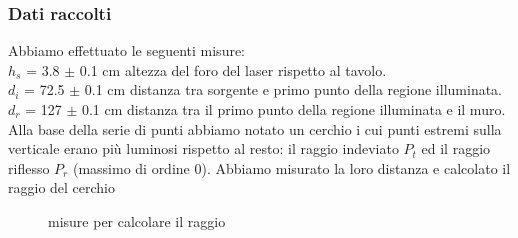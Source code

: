 \documentclass{article}
\theoremstyle{definition}
\begin{document}
\subsubsection{Dati raccolti}
Abbiamo effettuato le seguenti misure:\\

\noindent $h_{s}$ = 3.8 $\pm$ 0.1 cm altezza del foro del laser rispetto al tavolo.\\
$d_{i}$ = 72.5 $\pm$ 0.1 cm distanza tra sorgente e primo punto della regione illuminata.\\
$d_{r}$ = 127 $\pm$ 0.1 cm distanza tra il primo punto della regione illuminata e il muro.\\

\noindent Alla base della serie di punti abbiamo notato un cerchio i cui punti estremi sulla verticale erano più luminosi rispetto al resto: il raggio indeviato \(P_{t}\) ed il raggio riflesso \(P_{r}\) (massimo di ordine 0). Abbiamo misurato la loro distanza e calcolato il raggio del cerchio

\begin{figure}[!htbp]
    	\captionsetup{labelformat=empty}
    	\caption{misure per calcolare il raggio}
\end{figure}
\end{document}
